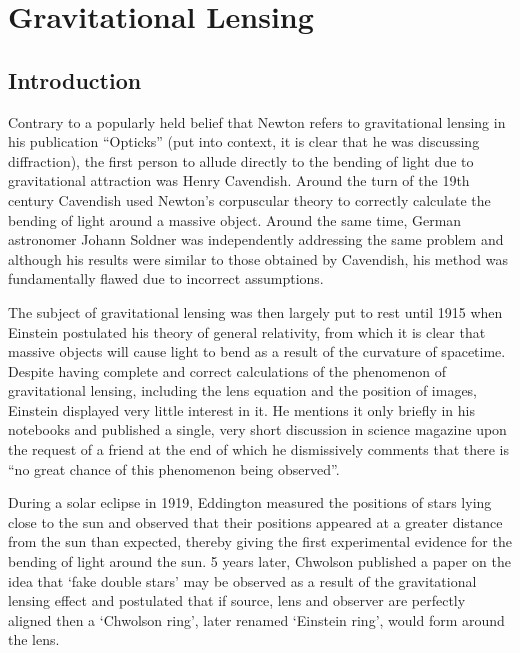 
\section{Gravitational Lensing} %
\label{sec:gravitational_lensing}

    \subsection{Introduction} %
    \label{sub:introduction}
        Contrary to a popularly held belief that Newton refers to gravitational lensing in his publication ``Opticks''\cite{Newton_Opticks} (put into context, it is clear that he was discussing diffraction), the first person to allude directly to the bending of light due to gravitational attraction was Henry Cavendish. Around the turn of the 19th century Cavendish used Newton's corpuscular theory to correctly calculate the bending of light around a massive object.  Around the same time, German astronomer Johann Soldner was independently addressing the same problem\cite{Soldner} and although his results were similar to those obtained by Cavendish, his method was fundamentally flawed due to incorrect assumptions\cite{Conceptual_origins_of_GL}.

        The subject of gravitational lensing was then largely put to rest until 1915 when Einstein postulated his theory of general relativity, from which it is clear that massive objects will cause light to bend as a result of the curvature of spacetime. Despite having complete and correct calculations of the phenomenon of gravitational lensing, including the lens equation and the position of images, Einstein displayed very little interest in it. He mentions it only briefly in his notebooks and published a single, very short discussion in science magazine upon the request of a friend at the end of which he dismissively comments that there is “no great chance of this phenomenon being observed”\cite{Einstein_science_magazine}.

        During a solar eclipse in 1919, Eddington measured the positions of stars lying close to the sun and observed that their positions appeared at a greater distance from the sun than expected, thereby giving the first experimental evidence for the bending of light around the sun\cite{Eddington_GL_evidence}. 5 years later, Chwolson published a paper on the idea that `fake double stars' may be observed as a result of the gravitational lensing effect and postulated that if source, lens and observer are perfectly aligned then a `Chwolson ring', later renamed `Einstein ring', would form around the lens\cite{Conceptual_origins_of_GL}.

